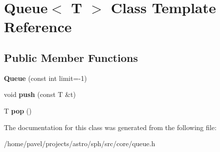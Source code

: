 \hypertarget{classQueue}{}\section{Queue$<$ T $>$ Class Template Reference}
\label{classQueue}
\subsection*{Public Member Functions}
\begin{DoxyCompactItemize}
\item 
\hypertarget{classQueue_a91ac6675519d0e0e7144f425a76098c2}{}\label{classQueue_a91ac6675519d0e0e7144f425a76098c2} 
{\bfseries Queue} (const int limit=-\/1)
\item 
\hypertarget{classQueue_a44fcd1beeb82917e62a183200a952fe6}{}\label{classQueue_a44fcd1beeb82917e62a183200a952fe6} 
void {\bfseries push} (const T \&t)
\item 
\hypertarget{classQueue_abeee018138cbb5226e5352a5788e23bd}{}\label{classQueue_abeee018138cbb5226e5352a5788e23bd} 
T {\bfseries pop} ()
\end{DoxyCompactItemize}


The documentation for this class was generated from the following file\+:\begin{DoxyCompactItemize}
\item 
/home/pavel/projects/astro/sph/src/core/queue.\+h\end{DoxyCompactItemize}

